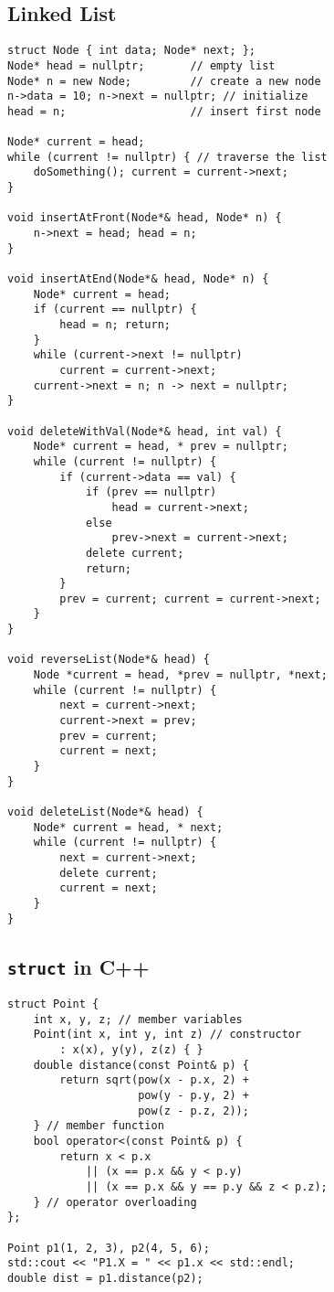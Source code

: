 \subsection*{Linked List}

\begin{verbatim}
struct Node { int data; Node* next; };
Node* head = nullptr;       // empty list
Node* n = new Node;         // create a new node
n->data = 10; n->next = nullptr; // initialize
head = n;                   // insert first node

Node* current = head;
while (current != nullptr) { // traverse the list
    doSomething(); current = current->next;
}

void insertAtFront(Node*& head, Node* n) {
    n->next = head; head = n;
}

void insertAtEnd(Node*& head, Node* n) {
    Node* current = head;
    if (current == nullptr) {
        head = n; return;
    }
    while (current->next != nullptr)
        current = current->next;
    current->next = n; n -> next = nullptr;
}

void deleteWithVal(Node*& head, int val) {
    Node* current = head, * prev = nullptr;
    while (current != nullptr) {
        if (current->data == val) {
            if (prev == nullptr)
                head = current->next;
            else
                prev->next = current->next;
            delete current;
            return;
        }
        prev = current; current = current->next;
    }
}

void reverseList(Node*& head) {
    Node *current = head, *prev = nullptr, *next;
    while (current != nullptr) {
        next = current->next;
        current->next = prev;
        prev = current;
        current = next;
    }
}

void deleteList(Node*& head) {
    Node* current = head, * next;
    while (current != nullptr) {
        next = current->next;
        delete current;
        current = next;
    }
}
\end{verbatim}
\vspace*{-1.25\baselineskip}

\subsection*{\texttt{struct} in C++}
\begin{verbatim}
struct Point {
    int x, y, z; // member variables
    Point(int x, int y, int z) // constructor
        : x(x), y(y), z(z) { }
    double distance(const Point& p) {
        return sqrt(pow(x - p.x, 2) +
                    pow(y - p.y, 2) +
                    pow(z - p.z, 2));
    } // member function
    bool operator<(const Point& p) {
        return x < p.x
            || (x == p.x && y < p.y)
            || (x == p.x && y == p.y && z < p.z);
    } // operator overloading
};

Point p1(1, 2, 3), p2(4, 5, 6);
std::cout << "P1.X = " << p1.x << std::endl;
double dist = p1.distance(p2);
\end{verbatim}

